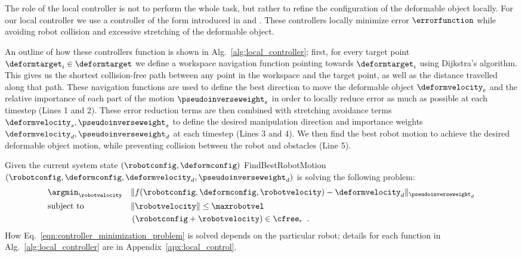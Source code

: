 The role of the local controller is not to perform the whole task, but rather to refine the configuration of the deformable object locally. For our local controller we use a controller of the form introduced in \cite{Berenson2013} and \cite{McConachie2018}. These controllers locally minimize error $\errorfunction$ while avoiding robot collision and excessive stretching of the deformable object.

An outline of how these controllers function is shown in Alg.~\ref{alg:local_controller}; 
first, for every target point $\deformtarget_i \in \deformtarget$ we define a workspace navigation function pointing towards $\deformtarget_i$ using Dijkstra's algorithm. This gives us the shortest collision-free path between any point in the workspace and the target point, as well as the distance travelled along that path. These navigation functions are used to define the best direction to move the deformable object $\deformvelocity_e$ and the relative importance of each part of the motion $\pseudoinverseweight_e$ in order to locally reduce error as much as possible at each timestep (Lines 1 and 2). These error reduction terms are then combined with stretching avoidance terms $\deformvelocity_s, \pseudoinverseweight_s$ to define the desired manipulation direction and importance weights $\deformvelocity_d, \pseudoinverseweight_d$ at each timestep (Lines 3 and 4). We then find the best robot motion to achieve the desired deformable object motion, while preventing collision between the robot and obstacles (Line 5).

Given the current system state $(\robotconfig, \deformconfig)$ FindBestRobotMotion$(\robotconfig, \deformconfig, \deformvelocity_d, \pseudoinverseweight_d)$ is solving the following problem:
\begin{equation}
\begin{aligned}
    & \argmin_{\robotvelocity } 
        & & \| f(\robotconfig, \deformconfig, \robotvelocity) - \deformvelocity_d \|_{\pseudoinverseweight_d} \\
    &\text{subject to}
        & & \| \robotvelocity \| \leq \maxrobotvel \\
    &   & & \left(\robotconfig + \robotvelocity\right) \in \cfree_r \enspace .
\end{aligned}
\label{eqn:controller_minimization_problem}
\end{equation}
How Eq.~\eqref{eqn:controller_minimization_problem} is solved depends on the particular robot; details for each function in Alg.~\ref{alg:local_controller} are in Appendix~\ref{apx:local_control}.


